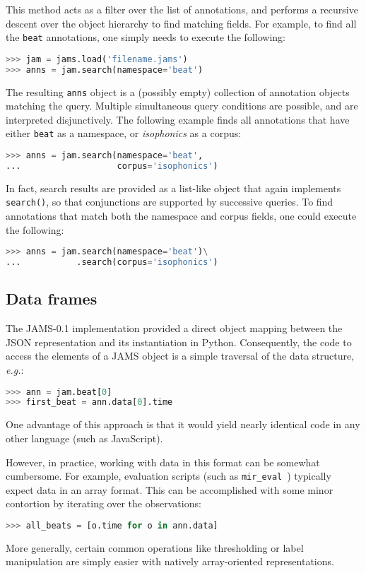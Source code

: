 \documentclass{article}
\begin{document}
This method acts as a filter over the list of annotations, and performs a recursive
descent over the object hierarchy to find matching fields.  For example, to find all the
\texttt{beat} annotations, one simply needs to execute the following:
\begin{lstlisting}[language=python]
>>> jam = jams.load('filename.jams')
>>> anns = jam.search(namespace='beat')
\end{lstlisting}
The resulting \texttt{anns} object is a (possibly empty) collection of annotation objects
matching the query.  Multiple simultaneous query conditions are possible, and are 
interpreted disjunctively.
The following example finds all annotations that have either
\texttt{beat} as a namespace, or \emph{isophonics} as a corpus:
\begin{lstlisting}[language=python]
>>> anns = jam.search(namespace='beat',
...                   corpus='isophonics')
\end{lstlisting}

In fact, search results are provided as a list-like object that again implements 
\texttt{search()}, so that conjunctions are supported by successive queries.
To find annotations that match both the namespace and corpus fields, one could execute 
the following:
\begin{lstlisting}[language=python]
>>> anns = jam.search(namespace='beat')\
...           .search(corpus='isophonics')
\end{lstlisting}


\subsection{Data frames}\label{sec:imp:dataframe}
The JAMS-0.1 implementation provided a direct object mapping between the JSON representation
and its instantiation in Python.
Consequently, the code to access the elements of a JAMS object is a simple traversal of the
data structure, \emph{e.g.}:
\begin{lstlisting}[language=python]
>>> ann = jam.beat[0]
>>> first_beat = ann.data[0].time
\end{lstlisting}
One advantage of this approach is that it would yield nearly identical code in any other
language (such as JavaScript).

However, in practice, working with data in this format can be somewhat cumbersome.
For example, evaluation scripts (such as \texttt{mir\_eval}~\cite{raffel2014}) typically expect
data in an array format.  This can be accomplished with some minor contortion by
iterating over the observations:
\begin{lstlisting}[language=python]
>>> all_beats = [o.time for o in ann.data]
\end{lstlisting}
More generally, certain common operations like thresholding or
label manipulation are simply easier with natively array-oriented representations.
\end{document}
